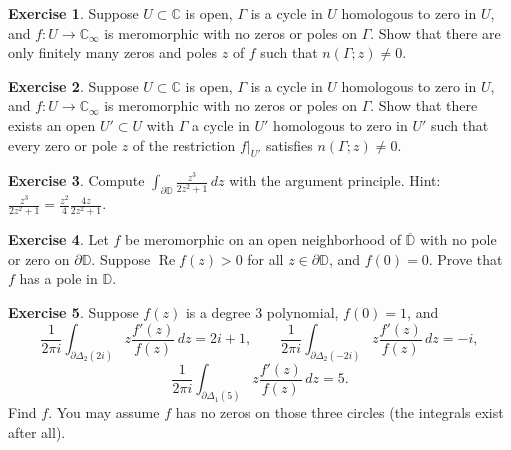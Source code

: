 \documentclass[12pt,openany]{book}
\renewcommand{\Re}{\operatorname{Re}}
\newcommand{\C}{{\mathbb{C}}}
\newcommand{\D}{{\mathbb{D}}}
\theoremstyle{plain}
\theoremstyle{remark}
\theoremstyle{definition}
\newenvironment{exbox}{%
    \def\FrameCommand{\vrule width 1pt \relax\hspace{10pt}}%
    \MakeFramed{\advance\hsize-\width\FrameRestore}%
}{%
    \endMakeFramed
}
\theoremstyle{exercise}
\newtheorem{exercise}{Exercise}[section]
\theoremstyle{example}
\begin{document}
\begin{exbox}
\begin{exercise}
Suppose $U \subset \C$ is open, $\Gamma$ is a cycle in $U$
homologous to zero in $U$,
and $f \colon U \to \C_\infty$ is meromorphic with no zeros or poles on $\Gamma$.
Show that there are only finitely many zeros and poles $z$ of $f$
such that $n(\Gamma;z) \neq 0$.
\end{exercise}

\begin{exercise}
Suppose $U \subset \C$ is open, $\Gamma$ is a cycle in $U$
homologous to zero in $U$,
and $f \colon U \to \C_\infty$ is meromorphic with
no zeros or poles on $\Gamma$.
Show that there exists an open $U' \subset U$
with $\Gamma$ a cycle in $U'$ homologous to zero in $U'$ such that
every zero or pole $z$ of the restriction $f|_{U'}$
satisfies $n(\Gamma;z) \neq 0$.
\end{exercise}

\begin{exercise}
Compute $\int_{\partial \D} \frac{z^3}{2 z^2+1} \, dz$ with the argument
principle.  Hint: $\frac{z^3}{2 z^2+1}=\frac{z^2}{4} \frac{4z}{2z^2+1}$.
\end{exercise}

\begin{exercise}
Let $f$ be meromorphic on an open neighborhood of $\overline{\D}$
with no pole or zero on $\partial \D$.  Suppose $\Re f(z) >
0$ for all $z \in \partial \D$, and $f(0) = 0$.  Prove that $f$ has a pole
in $\D$.
\end{exercise}

\begin{exercise}
Suppose $f(z)$ is a degree $3$ polynomial, $f(0)=1$, and
\begin{equation*}
\frac{1}{2\pi i}
\int_{\partial \Delta_2(2i)} z \frac{f'(z)}{f(z)} \, dz = 2i+1 ,
\qquad
\frac{1}{2\pi i}
\int_{\partial \Delta_2(-2i)} z \frac{f'(z)}{f(z)} \, dz = -i ,
\end{equation*}
\begin{equation*}
\frac{1}{2\pi i}
\int_{\partial \Delta_1(5)} z \frac{f'(z)}{f(z)} \, dz = 5 .
\end{equation*}
Find $f$.  You may assume $f$ has no zeros on those three circles
(the integrals exist after all).
\end{exercise}


\end{exbox}
\end{document}
